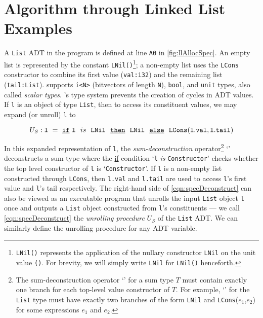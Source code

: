 \section{Algorithm through Linked List Examples}
A {\tt List} ADT in the
\SpecL{} program is defined at line {\tt A0}
in \cref{fig:llAllocSpec}. An empty list is represented
by the
constant {\tt LNil()}\footnote{{\tt LNil()} represents the application
of the nullary constructor {\tt LNil} on the unit value {\tt ()}. For brevity,
we will simply write {\tt LNil} for {\tt LNil()} henceforth.};
a non-empty list uses
the {\tt LCons} constructor to combine its first value ({\tt val:i32})
and the remaining list ({\tt tail:List}).
\SpecL{} supports
{\tt i<N>} (bitvectors of length {\tt N}),
{\tt bool}, and {\tt unit} types, also called {\em scalar types}.
\SpecL{}'s type system prevents
the creation of cycles in ADT values.
If {\tt l} is
an object of type {\tt List}, then to access its
constituent values, we may expand (or unroll) {\tt l} to
\begin{small}
\begin{equation}\label{eqn:specDeconstruct}
U_S: {\tt l\ =\ \underline{if}\ l}\ \ is\ \ {\tt LNil\ \ \underline{then}\ \ LNil\ \ \underline{else}\ \ LCons(l.val,l.tail)}
\end{equation}
\end{small}
In this expanded representation of {\tt l},
the {\em sum-deconstruction} operator\footnote{The sum-deconstruction operator `\sumDtor{}' for a sum type $T$ must contain exactly one branch for each top-level value constructor of $T$.
For example, `\sumDtor{}' for the {\tt List} type must have exactly two branches of the form {\tt LNil} and {\tt LCons}($e_1$,$e_2$) for some expressions $e_1$ and $e_2$.}
`\sumDtor{}'
deconstructs a sum type where the
\underline{if} condition `{\tt l} {\em is} {\tt Constructor}'
checks whether the top level constructor of {\tt l} is `{\tt Constructor}'.
If {\tt l}
is a non-empty list constructed through {\tt LCons},
then {\tt l.val} and {\tt l.tail}
are used to access {\tt l}'s first value and {\tt l}'s tail respectively.
The right-hand side of
\cref{eqn:specDeconstruct} can also be viewed as an executable
program that unrolls the input {\tt List} object {\tt l} once and
outputs a {\tt List} object constructed from {\tt l}'s constituents --- we
call \cref{eqn:specDeconstruct} the {\em unrolling procedure} $U_S$ of the {\tt List} ADT.
We can similarly define the unrolling procedure for any ADT variable.




